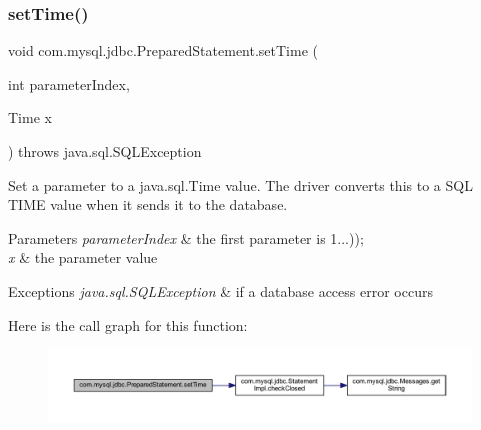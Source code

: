 \subsubsection{\texorpdfstring{set\+Time()}{setTime()}\hspace{0.1cm}{\footnotesize\ttfamily [2/2]}}
{\footnotesize\ttfamily void com.\+mysql.\+jdbc.\+Prepared\+Statement.\+set\+Time (\begin{DoxyParamCaption}\item[{int}]{parameter\+Index,  }\item[{Time}]{x }\end{DoxyParamCaption}) throws java.\+sql.\+S\+Q\+L\+Exception}

Set a parameter to a java.\+sql.\+Time value. The driver converts this to a S\+QL T\+I\+ME value when it sends it to the database.


\begin{DoxyParams}{Parameters}
{\em parameter\+Index} & the first parameter is 1...)); \\
\hline
{\em x} & the parameter value\\
\hline
\end{DoxyParams}

\begin{DoxyExceptions}{Exceptions}
{\em java.\+sql.\+S\+Q\+L\+Exception} & if a database access error occurs \\
\hline
\end{DoxyExceptions}
Here is the call graph for this function\+:
\nopagebreak
\begin{figure}[H]
\begin{center}
\leavevmode
\includegraphics[width=350pt]{classcom_1_1mysql_1_1jdbc_1_1_prepared_statement_a2edc3ed9d413dfc3dc612f8f27a6cf72_cgraph}
\end{center}
\end{figure}
\mbox{\label{classcom_1_1mysql_1_1jdbc_1_1_prepared_statement_a6ae79298e06ce58b5e8acb9d8fd66e65}} 
